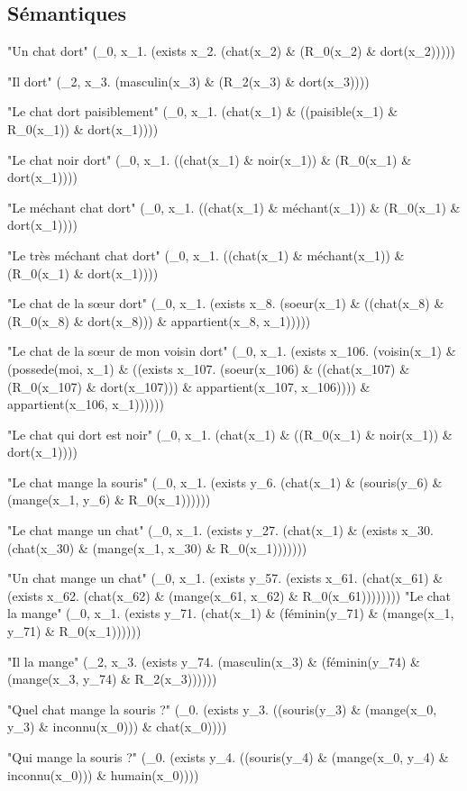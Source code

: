 \documentclass[12pt]{article}
\theoremstyle{exostyle}
\begin{document}
\subsection{Sémantiques}
\begin{spverbatim}
"Un chat dort"
 (\R_0, x_1. (exists x_2. (chat(x_2) & (R_0(x_2) & dort(x_2)))))

"Il dort"
 (\R_2, x_3. (masculin(x_3) & (R_2(x_3) & dort(x_3))))

"Le chat dort paisiblement"
 (\R_0, x_1. (chat(x_1) & ((paisible(x_1) & R_0(x_1)) & dort(x_1))))

"Le chat noir dort"
 (\R_0, x_1. ((chat(x_1) & noir(x_1)) & (R_0(x_1) & dort(x_1))))

"Le méchant chat dort"
 (\R_0, x_1. ((chat(x_1) & méchant(x_1)) & (R_0(x_1) & dort(x_1))))

"Le très méchant chat dort"
 (\R_0, x_1. ((chat(x_1) & méchant(x_1)) & (R_0(x_1) & dort(x_1))))

"Le chat de la sœur dort"
 (\R_0, x_1. (exists x_8. (soeur(x_1) & ((chat(x_8) & (R_0(x_8) & dort(x_8))) & appartient(x_8, x_1)))))

"Le chat de la sœur de mon voisin dort"
 (\R_0, x_1. (exists x_106. (voisin(x_1) & (possede(moi, x_1) & ((exists x_107. (soeur(x_106) & ((chat(x_107) & (R_0(x_107) & dort(x_107))) & appartient(x_107, x_106)))) & appartient(x_106, x_1))))))

"Le chat qui dort est noir"
 (\R_0, x_1. (chat(x_1) & ((R_0(x_1) & noir(x_1)) & dort(x_1))))

"Le chat mange la souris"
 (\R_0, x_1. (exists y_6. (chat(x_1) & (souris(y_6) & (mange(x_1, y_6) & R_0(x_1))))))

"Le chat mange un chat"
 (\R_0, x_1. (exists y_27. (chat(x_1) & (exists x_30. (chat(x_30) & (mange(x_1, x_30) & R_0(x_1)))))))

"Un chat mange un chat"
 (\R_0, x_1. (exists y_57. (exists x_61. (chat(x_61) & (exists x_62. (chat(x_62) & (mange(x_61, x_62) & R_0(x_61))))))))
"Le chat la mange"
 (\R_0, x_1. (exists y_71. (chat(x_1) & (féminin(y_71) & (mange(x_1, y_71) & R_0(x_1))))))

"Il la mange"
 (\R_2, x_3. (exists y_74. (masculin(x_3) & (féminin(y_74) & (mange(x_3, y_74) & R_2(x_3))))))

"Quel chat mange la souris ?"
 (\x_0. (exists y_3. ((souris(y_3) & (mange(x_0, y_3) & inconnu(x_0))) & chat(x_0))))

"Qui mange la souris ?"
 (\x_0. (exists y_4. ((souris(y_4) & (mange(x_0, y_4) & inconnu(x_0))) & humain(x_0))))


\end{spverbatim}
\end{document}
